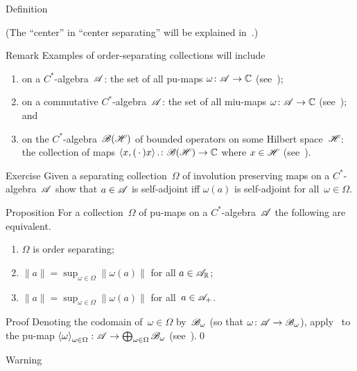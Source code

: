 \documentclass[a]{subfiles}
\begin{document}
\begin{parsec}
\begin{point}[separating]{Definition}
\begin{enumerate}
(The ``center'' in ``center separating''
will be explained in~.)
\end{enumerate}
\end{point}
\begin{point}{Remark}%
Examples of order-separating
collections will include
\begin{enumerate}
\item
on a $C^*$-algebra~$\mathscr{A}$:
the set of all pu-maps $\omega\colon \mathscr{A}\to\mathbb{C}$
(see~);
\item
on a commutative $C^*$-algebra~$\mathscr{A}$:
the set of all miu-maps $\omega\colon \mathscr{A}\to\mathbb{C}$
(see~); and
\item
on the $C^*$-algebra~$\mathscr{B}(\mathscr{H})$
of bounded operators on some Hilbert space~$\mathscr{H}$:
the collection of maps  $\left<x,(\,\cdot\,)x\right>.
\colon \mathscr{B}(\mathscr{H})\to\mathbb{C}$ where $x\in \mathscr{H}$
(see~).
\end{enumerate}
\end{point}
\begin{point}{Exercise}%
Given a separating collection~$\Omega$
of involution preserving maps
on a $C^*$-algebra~$\mathscr{A}$
show that $a\in\mathscr{A}$ is self-adjoint
iff $\omega(a)$ is self-adjoint for all~$\omega\in\Omega$.
\end{point}
\begin{point}{Proposition}%
For a collection~$\Omega$ of pu-maps on a $C^*$-algebra~$\mathscr{A}$
the following are equivalent.
\begin{enumerate}
\item 
	$\Omega$ is order separating;
\item
	$\|a\|= \sup_{\omega\in\Omega} \left\|\omega(a)\right\|$
	for all $a\in \mathscr{A}_{\mathbb{R}}$;
\item
	$\|a\| = \sup_{\omega\in\Omega} \left\|\omega(a)\right\|$
	for all~$a\in \mathscr{A}_{+}$.
\end{enumerate}
\begin{point}{Proof}%
Denoting the codomain of~$\omega\in\Omega$
by~$\mathscr{B}_\omega$
(so that $\omega\colon \mathscr{A}\to\mathscr{B}_\omega$),
apply~
to the pu-map $\left<\omega\right>_{\omega\in\Omega}\colon 
\mathscr{A}\to\bigoplus_{\omega\in\Omega}
\mathscr{B}_\omega$ (see~).\qed
\end{point}
\begin{point}{Warning}%

\end{point}
\end{point}
\end{parsec}
\end{document}
